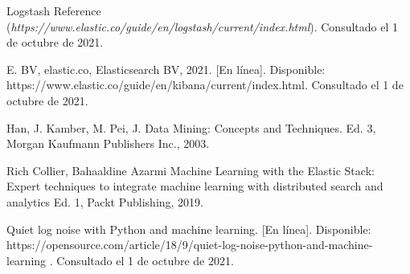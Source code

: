 

\begin{thebibliography}{99}
 Logstash Reference ({\it https://www.elastic.co/guide/en/logstash/current/index.html}). Consultado el 1 de octubre de 2021.

E. BV, elastic.co, Elasticsearch BV, 2021. [En línea]. Disponible:
https://www.elastic.co/guide/en/kibana/current/index.html. Consultado el 1 de octubre de 2021.

Han, J. Kamber, M. Pei, J. Data Mining: Concepts and Techniques. Ed. 3,
Morgan Kaufmann Publishers Inc., 2003.

Rich Collier, Bahaaldine Azarmi  Machine Learning with the Elastic Stack: Expert techniques to integrate machine learning with distributed search and analytics Ed. 1,
Packt Publishing, 2019.

Quiet log noise with Python and machine learning. [En línea]. Disponible:
https://opensource.com/article/18/9/quiet-log-noise-python-and-machine-learning
. Consultado el 1 de octubre de 2021.

\end{thebibliography}

